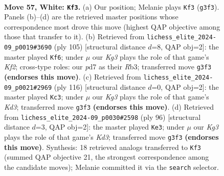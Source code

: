 \documentclass[11pt]{article}
\begin{document}
\clearpage

\begin{figure}[p]\centering
\begin{subfigure}{0.46\textwidth}\centering
\resizebox{\linewidth}{!}{%
\newchessgame
\chessboard[
  setfen={8/p2p4/2p2k2/8/2r5/6K1/8/8 w - - 0 57},
  showmover=false,
  pgfstyle=straightmove, color=movearrow, markmove={g3-f3}
]}
\caption{}
\end{subfigure}\hfill
\begin{subfigure}{0.46\textwidth}\centering
\resizebox{\linewidth}{!}{%
\newchessgame
\chessboard[
  setfen={8/5k2/8/1PP1R3/7K/1r6/8/8 b - - 0 53},
  showmover=false,
  pgfstyle=straightmove, color=movearrow, markmove={f7-f6}
]}
\caption{}
\end{subfigure}
\\[4pt]
\begin{subfigure}{0.46\textwidth}\centering
\resizebox{\linewidth}{!}{%
\newchessgame
\chessboard[
  setfen={8/pp6/2p5/8/6k1/3K4/r7/8 w - - 0 59},
  showmover=false,
  pgfstyle=straightmove, color=movearrow, markmove={d3-c3}
]}
\caption{}
\end{subfigure}\hfill
\begin{subfigure}{0.46\textwidth}\centering
\resizebox{\linewidth}{!}{%
\newchessgame
\chessboard[
  setfen={R7/2k2p1p/4p3/8/8/3K4/5r2/8 w - - 1 49},
  showmover=false,
  pgfstyle=straightmove, color=movearrow, markmove={d3-e3}
]}
\caption{}
\end{subfigure}
\caption{\textbf{Move 57, White: \texttt{Kf3}.} (a) Our position; Melanie plays \texttt{Kf3} (\texttt{g3f3}). Panels (b)--(d) are the retrieved master positions whose correspondence most drove this move (highest QAP objective among those that transfer to it). (b) Retrieved from \texttt{lichess\_elite\_2024-09\_p0019\#3690} (ply 105) [structural distance $d$=8, QAP obj=2]: the master played \texttt{Kf6}; under $\mu$ our \emph{Kg3} plays the role of that game's \emph{Kf2}; cross-type roles: our \emph{p}d7 as their \emph{R}b3; transferred move \texttt{g3f3} \textbf{(endorses this move)}. (c) Retrieved from \texttt{lichess\_elite\_2024-09\_p0021\#2969} (ply 116) [structural distance $d$=0, QAP obj=2]: the master played \texttt{Kc3}; under $\mu$ our \emph{Kg3} plays the role of that game's \emph{Kd3}; transferred move \texttt{g3f3} \textbf{(endorses this move)}. (d) Retrieved from \texttt{lichess\_elite\_2024-09\_p0030\#2598} (ply 96) [structural distance $d$=3, QAP obj=2]: the master played \texttt{Ke3}; under $\mu$ our \emph{Kg3} plays the role of that game's \emph{Kd3}; transferred move \texttt{g3f3} \textbf{(endorses this move)}. Synthesis: 18 retrieved analogs transferred to \texttt{Kf3} (summed QAP objective 21, the strongest correspondence among the candidate moves); Melanie committed it via the \texttt{search} selector.}
\label{fig:thought-m112}
\end{figure}
\end{document}
